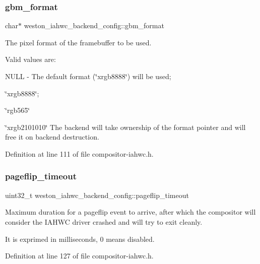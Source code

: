 \subsubsection{\texorpdfstring{gbm\+\_\+format}{gbm\_format}}
{\footnotesize\ttfamily char$\ast$ weston\+\_\+iahwc\+\_\+backend\+\_\+config\+::gbm\+\_\+format}

The pixel format of the framebuffer to be used.

Valid values are\+:
\begin{DoxyItemize}
\item N\+U\+LL -\/ The default format (\char`\"{}xrgb8888\char`\"{}) will be used;
\item \char`\"{}xrgb8888\char`\"{};
\item \char`\"{}rgb565\char`\"{}
\item \char`\"{}xrgb2101010\char`\"{} The backend will take ownership of the format pointer and will free it on backend destruction. 
\end{DoxyItemize}

Definition at line 111 of file compositor-\/iahwc.\+h.

\mbox{\label{structweston__iahwc__backend__config_af4155ad1f54bc45582a1783d62c53fb9}} 
\subsubsection{\texorpdfstring{pageflip\+\_\+timeout}{pageflip\_timeout}}
{\footnotesize\ttfamily uint32\+\_\+t weston\+\_\+iahwc\+\_\+backend\+\_\+config\+::pageflip\+\_\+timeout}

Maximum duration for a pageflip event to arrive, after which the compositor will consider the I\+A\+H\+WC driver crashed and will try to exit cleanly.

It is exprimed in milliseconds, 0 means disabled. 

Definition at line 127 of file compositor-\/iahwc.\+h.

\mbox{\label{structweston__iahwc__backend__config_aebd15a83584df1a374b36c7acccaa711}} 
